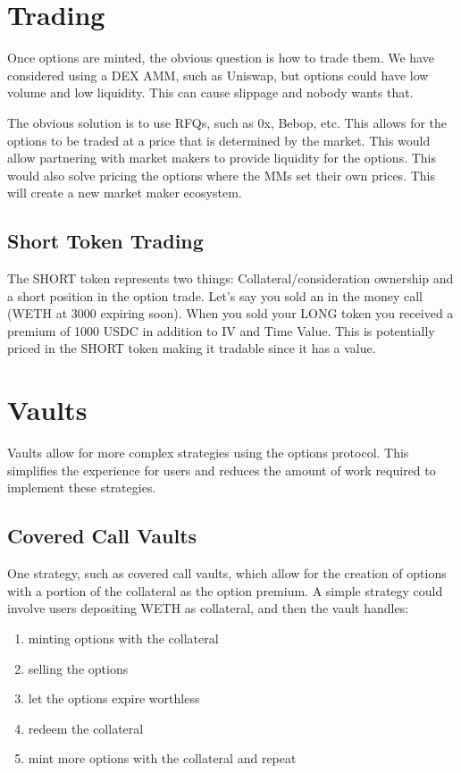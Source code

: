 \documentclass[%
 reprint,
 amsmath,amssymb,
 aps,
]{revtex4-2}
\begin{document}
\section{\label{sec:trading}Trading}

Once options are minted, the obvious question is how to trade them. We
have considered using a DEX AMM, such as Uniswap, but options could have
low volume and low liquidity. This can cause slippage and nobody wants
that.

The obvious solution is to use RFQs, such as 0x, Bebop, etc. This allows
for the options to be traded at a price that is determined by the
market. This would allow partnering with market makers to provide
liquidity for the options. This would also solve pricing the options
where the MMs set their own prices. This will create a new market maker
ecosystem.

\subsection{Short Token Trading}

The SHORT token represents two things:
Collateral/consideration ownership and a short position in the option
trade. Let's say you sold an in the money call (WETH at 3000 expiring
soon). When you sold your LONG token you received a premium of 1000 USDC
in addition to IV and Time Value. This is potentially priced in the
SHORT token making it tradable since it has a value.

\section{\label{sec:vaults}Vaults}

Vaults allow for more complex strategies using the options protocol.
This simplifies the experience for users and reduces the amount of work
required to implement these strategies.

\subsection{Covered Call Vaults}

One strategy, such as covered call vaults, which allow for the creation
of options with a portion of the collateral as the option premium. A
simple strategy could involve users depositing WETH as collateral, and
then the vault handles:
\begin{enumerate}
\item minting options with the collateral
\item selling the options
\item let the options expire worthless
\item redeem the collateral
\item mint more options with the collateral and repeat
\end{enumerate}
\end{document}
